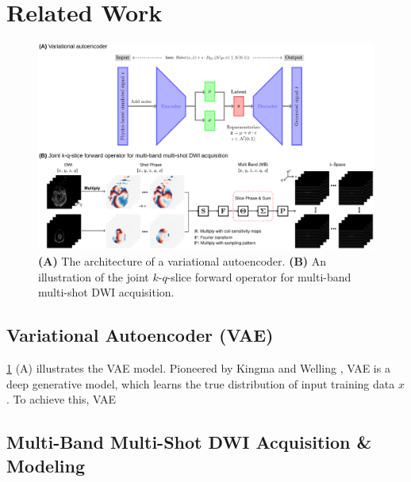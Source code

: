 \documentclass[journal,twoside,web]{ieeecolor}
\begin{document}
	\section{Related Work}

    \begin{figure}
		\centering
		\includegraphics[width=\textwidth]{../figures/fig1.png}
		\caption{\textbf{(A)} The architecture of a variational autoencoder.
            \textbf{(B)} An illustration of the joint $k$-$q$-slice forward operator
            for multi-band multi-shot DWI acquisition.}
		\label{FIG:MODEL}
	\end{figure}

    \subsection{Variational Autoencoder (VAE)}

    \cref{FIG:MODEL} (A) illustrates the VAE model.
    Pioneered by Kingma and Welling \cite{kingma_2014_vae},
    VAE is a deep generative model,
    which learns the true distribution of input training data $x$.
    To achieve this, VAE

    \subsection{Multi-Band Multi-Shot DWI Acquisition \& Modeling}
\end{document}
